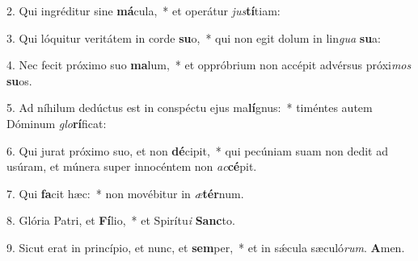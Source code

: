 2. Qui ingréditur sine \textbf{má}cula,~*  et operátur \textit{jus}\textbf{tí}tiam:\

3. Qui lóquitur veritátem in corde \textbf{su}o,~*  qui non egit dolum in lin\textit{gua} \textbf{su}a:\

4. Nec fecit próximo suo \textbf{ma}lum,~*  et oppróbrium non accépit advérsus próxi\textit{mos} \textbf{su}os.\

5. Ad níhilum dedúctus est in conspéctu ejus ma\textbf{lí}gnus:~*  timéntes autem Dóminum \textit{glo}\textbf{rí}ficat:\

6. Qui jurat próximo suo, et non \textbf{dé}cipit,~*  qui pecúniam suam non dedit ad usúram, et múnera super innocéntem non \textit{ac}\textbf{cé}pit.\

7. Qui \textbf{fa}cit hæc:~*  non movébitur in \textit{æ}\textbf{tér}num.\

8. Glória Patri, et \textbf{Fí}lio,~*  et Spirítu\textit{i} \textbf{Sanc}to.\

9. Sicut erat in princípio, et nunc, et \textbf{sem}per,~*  et in sǽcula sæculó\textit{rum}. \textbf{A}men.\

